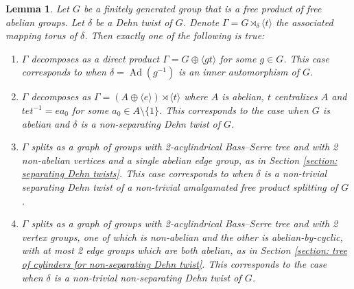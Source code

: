 \documentclass{amsart}
\DeclareMathOperator{\Ad}{Ad}
\theoremstyle{plain}
\newtheorem{lemma}[thm]{Lemma}
\theoremstyle{definition}
\theoremstyle{remark}
\begin{document}
\begin{lemma}
    \label{lem: Alternatives on canonical splittings of mapping torus}
    Let $G$ be a finitely generated group that is a free product of free abelian groups. Let $\delta$ be a Dehn twist of $G$. Denote $\Gamma = G \rtimes_{\delta} \langle t \rangle$ the associated mapping torus of $\delta$. Then exactly one of the following is true: 

    \begin{enumerate}
        \item $\Gamma$ decomposes as a direct product $\Gamma = G \oplus \langle gt \rangle$ for some $g \in G$. This case corresponds to when $\delta = \Ad(g^{-1})$ is an inner automorphism of $G$.
        \item $\Gamma$ decomposes as $\Gamma = (A \oplus \langle e \rangle) \rtimes \langle t \rangle$ where $A$ is abelian, $t$ centralizes $A$ and $tet^{-1} = ea_0$ for some $a_0 \in A \setminus \{1\}$. This corresponds to the case when $G$ is abelian and $\delta$ is a non-separating Dehn twist of $G$.
        \item $\Gamma$ splits as a graph of groups with 2-acylindrical Bass--Serre tree and with 2 non-abelian vertices and a single abelian edge group, as in Section \ref{section: separating Dehn twists}. This case corresponds to when $\delta$ is a non-trivial separating Dehn twist of a non-trivial amalgamated free product splitting of $G$. 
        \item $\Gamma$ splits as a graph of groups with 2-acylindrical Bass--Serre tree and with 2 vertex groups, one of which is non-abelian and the other is abelian-by-cyclic, with at most 2 edge groups which are both abelian, as in Section \ref{section: tree of cylinders for non-separating Dehn twist}. This corresponds to the case when $\delta$ is a non-trivial non-separating Dehn twist of $G$. 
    \end{enumerate}
\end{lemma}
\end{document}

